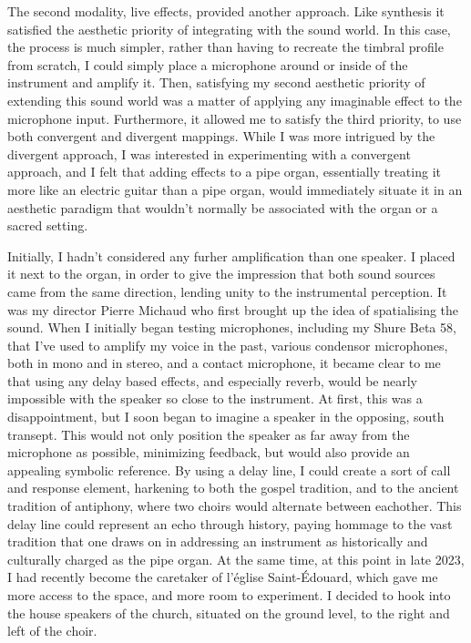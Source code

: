 \documentclass[12pt,twoside,maitrise]{dms_ks}
\theoremstyle{definition}
\begin{document}
The second modality, live effects, provided another approach. 
Like synthesis it satisfied the aesthetic priority of integrating with the sound world. 
In this case, the process is much simpler, rather than having to recreate the timbral profile from scratch, I could simply place a microphone around or inside of the instrument and amplify it. 
Then, satisfying my second aesthetic priority of extending this sound world was a matter of applying any imaginable effect to the microphone input. 
Furthermore, it allowed me to satisfy the third priority, to use both convergent and divergent mappings. 
While I was more intrigued by the divergent approach, I was interested in experimenting with a convergent approach, and I felt that adding effects to a pipe organ, essentially treating it more like an electric guitar than a pipe organ, would immediately situate it in an aesthetic paradigm that wouldn't normally be associated with the organ or a sacred setting. 

Initially, I hadn't considered any furher amplification than one speaker. 
I placed it next to the organ, in order to give the impression that both sound sources came from the same direction, lending unity to the instrumental perception. 
It was my director Pierre Michaud who first brought up the idea of spatialising the sound. 
When I initially began testing microphones, including my Shure Beta 58, that I've used to amplify my voice in the past, various condensor microphones, both in mono and in stereo, and a contact microphone, it became clear to me that using any delay based effects, and especially reverb, would be nearly impossible with the speaker so close to the instrument. 
At first, this was a disappointment, but I soon began to imagine a speaker in the opposing, south transept. 
This would not only position the speaker as far away from the microphone as possible, minimizing feedback, but would also provide an appealing symbolic reference. 
By using a delay line, I could create a sort of call and response element, harkening to both the gospel tradition, and to the ancient tradition of antiphony, where two choirs would alternate between eachother. 
This delay line could represent an echo through history, paying hommage to the vast tradition that one draws on in addressing an instrument as historically and culturally charged as the pipe organ. 
At the same time, at this point in late 2023, I had recently become the caretaker of l'église Saint-Édouard, which gave me more access to the space, and more room to experiment. 
I decided to hook into the house speakers of the church, situated on the ground level, to the right and left of the choir. 
\end{document}
